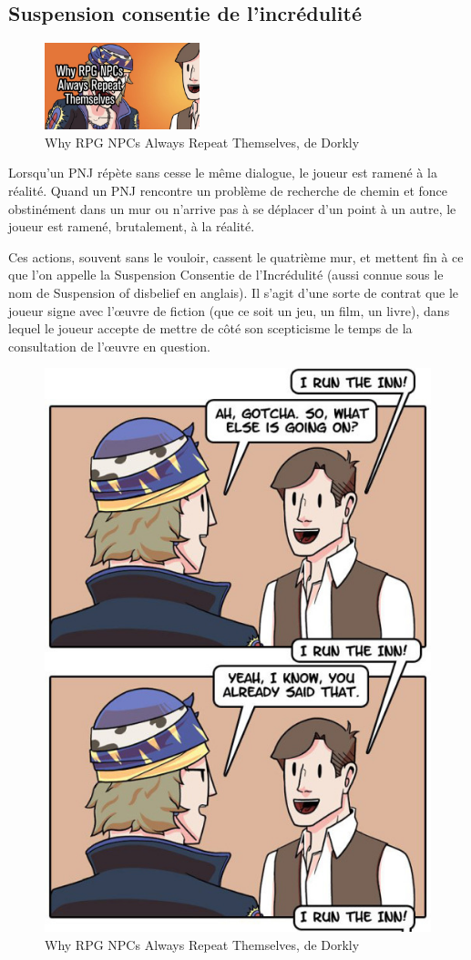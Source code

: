 \documentclass[a4paper, 12pt]{article} %
\begin{document}
\newpage

\subsection{Suspension consentie de l'incrédulité}

\begin{figure}
	\begin{center}
		\includegraphics[width=0.40\textwidth]{images/repeat1.png}
	\end{center}
	\caption{Why RPG NPCs Always Repeat Themselves, de Dorkly}
\end{figure}

Lorsqu’un PNJ répète sans cesse le même dialogue, le joueur est ramené à la réalité. Quand un PNJ rencontre un problème de recherche de chemin et fonce obstinément dans un mur ou n’arrive pas à se déplacer d’un point à un autre, le joueur est ramené, brutalement, à la réalité. 

Ces actions, souvent sans le vouloir, cassent le quatrième mur, et mettent fin à ce que l’on appelle la Suspension Consentie de l’Incrédulité\cite{scdli} (aussi connue sous le nom de Suspension of disbelief en anglais). Il s’agit d’une sorte de contrat que le joueur signe avec l’œuvre de fiction (que ce soit un jeu, un film, un livre), dans lequel le joueur accepte de mettre de côté son scepticisme le temps de la consultation de l’œuvre en question. 

\begin{figure}[!h]%
	\begin{center} 
		\includegraphics[width=0.40\columnwidth]{images/repeat2.png}%
		\caption{Why RPG NPCs Always Repeat Themselves, de Dorkly}%
	\end{center}
\end{figure}
\end{document}
